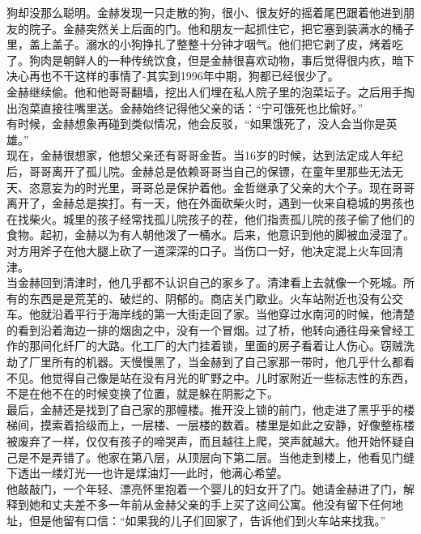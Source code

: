 狗却没那么聪明。金赫发现一只走散的狗，很小、很友好的摇着尾巴跟着他进到朋友的院子。金赫突然关上后面的门。他和朋友一起抓住它，把它塞到装满水的桶子里，盖上盖子。溺水的小狗挣扎了整整十分钟才咽气。他们把它剥了皮，烤着吃了。狗肉是朝鲜人的一种传统饮食，但是金赫很喜欢动物，事后觉得很内疚，暗下决心再也不干这样的事情了-其实到1996年中期，狗都已经很少了。\\

金赫继续偷。他和他哥哥翻墙，挖出人们埋在私人院子里的泡菜坛子。之后用手掏出泡菜直接往嘴里送。金赫始终记得他父亲的话：“宁可饿死也比偷好。”\\

有时候，金赫想象再碰到类似情况，他会反驳，“如果饿死了，没人会当你是英雄。”\\

现在，金赫很想家，他想父亲还有哥哥金哲。当16岁的时候，达到法定成人年纪后，哥哥离开了孤儿院。金赫总是依赖哥哥当自己的保镖，在童年里那些无法无天、恣意妄为的时光里，哥哥总是保护着他。金哲继承了父亲的大个子。现在哥哥离开了，金赫总是挨打。有一天，他在外面砍柴火时，遇到一伙来自稳城的男孩也在找柴火。城里的孩子经常找孤儿院孩子的茬，他们指责孤儿院的孩子偷了他们的食物。起初，金赫以为有人朝他泼了一桶水。后来，他意识到他的脚被血浸湿了。对方用斧子在他大腿上砍了一道深深的口子。当伤口一好，他决定混上火车回清津。\\

当金赫回到清津时，他几乎都不认识自己的家乡了。清津看上去就像一个死城。所有的东西是是荒芜的、破烂的、阴郁的。商店关门歇业。火车站附近也没有公交车。他就沿着平行于海岸线的第一大街走回了家。当他穿过水南河的时候，他清楚的看到沿着海边一排的烟囱之中，没有一个冒烟。过了桥，他转向通往母亲曾经工作的那间化纤厂的大路。化工厂的大门挂着锁，里面的房子看着让人伤心。窃贼洗劫了厂里所有的机器。天慢慢黑了，当金赫到了自己家那一带时，他几乎什么都看不见。他觉得自己像是站在没有月光的旷野之中。儿时家附近一些标志性的东西，不是在他不在的时候变换了位置，就是躲在阴影之下。\\

最后，金赫还是找到了自己家的那幢楼。推开没上锁的前门，他走进了黑乎乎的楼梯间，摸索着拾级而上，一层楼、一层楼的数着。楼里是如此之安静，好像整栋楼被废弃了一样，仅仅有孩子的啼哭声，而且越往上爬，哭声就越大。他开始怀疑自己是不是弄错了。他家在第八层，从顶层向下第二层。当他走到楼上，他看见门缝下透出一缕灯光──也许是煤油灯──此时，他满心希望。\\

他敲敲门，一个年轻、漂亮怀里抱着一个婴儿的妇女开了门。她请金赫进了门，解释到她和丈夫差不多一年前从金赫父亲的手上买了这间公寓。他没有留下任何地址，但是他留有口信：“如果我的儿子们回家了，告诉他们到火车站来找我。”\\

